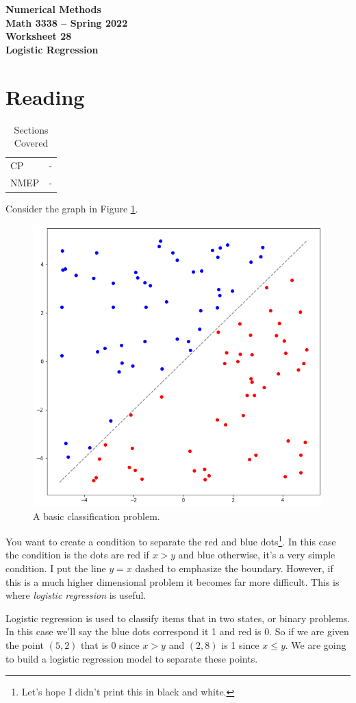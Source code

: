 \documentclass[11pt,letterpaper]{article}
\newcommand{\semester}{Spring 2022}
\begin{document}
\begin{center}
{\huge{\bf  Numerical Methods}} \\[1.5ex]
{\bf Math 3338 -- \semester}\\[1.5ex]
{\Large{\bf Worksheet 28\ \\[2ex] Logistic Regression}}\\
\end{center}
\vspace{2mm}


\section{Reading}

\begin{table}[!ht]
 \centering
 \begin{tabular}{lc}
   CP & - \\
 NMEP &  -
 \end{tabular}
\caption{Sections Covered}
\end{table}

Consider the graph in Figure \ref{fig:classification}.
\begin{figure}[!h]
 \centering
 \includegraphics[width=.4\textwidth]{images/classification.png}
 \caption{A basic classification problem.}
 \label{fig:classification}
\end{figure}
You want to create a condition to separate the red and blue dots\footnote{Let's hope I didn't print this in black and white.}. In this case the condition is the dots are red if $x>y$ and blue otherwise, it's a very simple condition. I put the line $y=x$ dashed to emphasize the boundary. However, if this is a much higher dimensional problem it becomes far more difficult. This is where \emph{logistic regression} is useful. 

Logistic regression is used to classify items that in two states, or binary problems. In this case we'll say the blue dots correspond it 1 and red is 0. So if we are given the point $(5,2)$ that is 0 since $x>y$ and $(2,8)$ is 1 since $x\le y$. We are going to build a logistic regression model to separate these points. 
\end{document}
